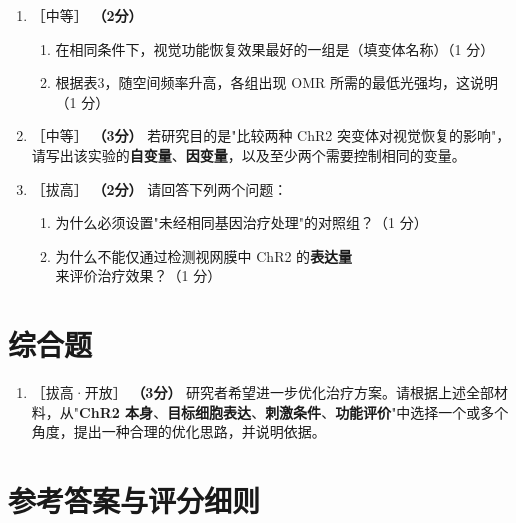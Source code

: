 \documentclass[UTF8,a4paper,11pt]{ctexart}
\newcommand{\pt}[1]{\textbf{（#1分）}}
\newcommand{\lv}[1]{{\small\color{deepgreen}［#1］}}
\newcommand{\tian}[1]{\underline{\hspace{#1}}}
\begin{document}
\begin{enumerate}[leftmargin=2.2em,itemsep=5pt,start=7]
\item \lv{中等} \pt{2}
\begin{enumerate}[label=(\arabic*),leftmargin=1.4em,itemsep=2pt]
\item 在相同条件下，视觉功能恢复效果最好的一组是\tian{3.6cm}（填变体名称）（1 分）
\item 根据表3，随空间频率升高，各组出现 OMR 所需的最低光强均\tian{1.2cm}，这说明\tian{0.42\textwidth}（1 分）
\end{enumerate}

\item \lv{中等} \pt{3} 若研究目的是"比较两种 ChR2 突变体对视觉恢复的影响"，请写出该实验的\textbf{自变量}、\textbf{因变量}，以及至少两个需要控制相同的变量。\tian{0.5\textwidth}

\item \lv{拔高} \pt{2} 请回答下列两个问题：
\begin{enumerate}[label=(\arabic*),leftmargin=1.4em,itemsep=2pt]
\item 为什么必须设置"未经相同基因治疗处理"的对照组？（1 分）
\item 为什么不能仅通过检测视网膜中 ChR2 的\textbf{表达量}来评价治疗效果？（1 分）
\end{enumerate}
\end{enumerate}

\section{综合题}

\begin{enumerate}[leftmargin=2.2em,itemsep=5pt,start=10]
\item \lv{拔高·开放} \pt{3} 研究者希望进一步优化治疗方案。请根据上述全部材料，从"\textbf{ChR2 本身}、\textbf{目标细胞表达}、\textbf{刺激条件}、\textbf{功能评价}"中选择一个或多个角度，提出一种合理的优化思路，并说明依据。
\end{enumerate}

\clearpage
\section*{参考答案与评分细则}
\end{document}
